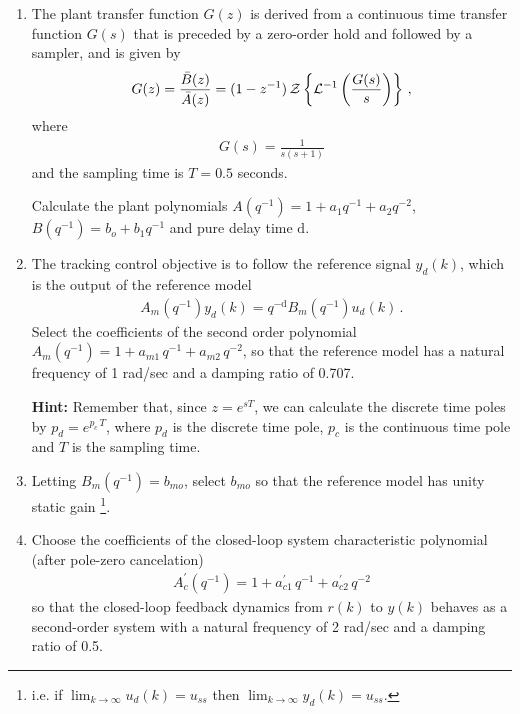 \begin{enumerate}
    \item
    The plant transfer function $G(z)$ is derived from a continuous time transfer function $G(s)$ that is preceded by a zero-order hold and followed by a sampler, and is given by
    \begin{align*}
        G(z) = \frac{\bar{B}(z)}{\bar{A}(z)}
            = (1 - z^{-1}) \, {\cal Z} \left \{ {\cal L}^{-1} \left ( \frac{G(s)}{s} \right ) \right \}\,,
    \end{align*}
    where
    \begin{align*}
        G(s) = \frac{1}{s(s + 1)}
    \end{align*}
    and the sampling time is $T = 0.5$ seconds.

    Calculate the plant polynomials $A(q^{-1}) = 1 + a_1 q^{-1} + a_2 q^{-2}$,  $B(q^{-1}) = b_o +  b_1 q^{-1}$  and pure delay time $\textrm{d}$. %

    \item
    \label{sec:track}
    The tracking control objective is to follow the reference signal $y_d(k)$, which is the output of the reference model
    \begin{align}
        A_m (q^{-1}) y_d(k) = q^{-\textrm{d}} B_m(q^{-1}) u_d(k) \,.
        \label{eq:yd_def}
    \end{align}
    Select the coefficients of the second order polynomial $A_m(q^{-1}) = 1 + a_{m1}\, q^{-1} + a_{m2} \, q^{-2}$, so that the reference model has a natural frequency of 1 rad/sec and a damping ratio of 0.707.

    \textbf{Hint:} Remember that, since $z = e^{s T}$, we can calculate the discrete time poles by $p_d = e^{p_c \, T}$, where $p_d$ is the discrete time pole, $p_c$ is the continuous time pole and $T$ is the sampling time.

    \item
    Letting $B_m(q^{-1}) = b_{mo}$, select $b_{mo}$ so that the reference model has unity static gain
    \footnote{i.e. if $\lim_{k \to \infty} u_d(k)  = u_{ss}$  then  $\lim_{k \to \infty} y_d(k)  = u_{ss}$.}.

    \item
    Choose the coefficients of the closed-loop system characteristic polynomial (after pole-zero cancelation)
    \begin{align*}
        A_c^{' } (q^{-1}) =  1 + a^{'}_{c1}\, q^{-1} + a^{'}_{c2} \, q^{-2}
    \end{align*}
    so that the closed-loop feedback dynamics from $r(k)$ to $y(k)$ behaves as a second-order system with  a natural frequency of 2 rad/sec and a damping ratio of 0.5.


\end{enumerate}
